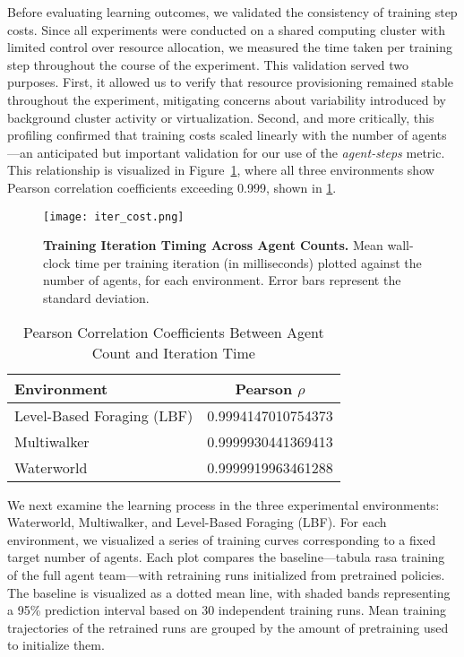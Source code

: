 Before evaluating learning outcomes, we validated the consistency of training step costs.
Since all experiments were conducted on a shared computing cluster with limited 
control over resource allocation, we measured the time taken per training
step throughout the course of the experiment. This validation served two purposes. First, 
it allowed us to verify that resource provisioning remained stable throughout the experiment, 
mitigating concerns about variability introduced by background cluster activity or virtualization.
Second, and more critically, this profiling confirmed that training costs scaled linearly 
with the number of agents—an anticipated but important validation for our use of the 
\emph{agent-steps} metric. This relationship is visualized in Figure~\ref{fig:agent-steps}, 
where all three environments show Pearson correlation coefficients exceeding 0.999,
shown in \ref{tab:pearson-corr}.
\begin{figure}[!ht]
    \centering
    \texttt{[image: iter\_cost.png]}
    \caption{\textbf{Training Iteration Timing Across Agent Counts.} %
        Mean wall-clock time per training iteration (in milliseconds) plotted against the number 
        of agents, for each environment. Error bars represent the standard deviation.}
    \label{fig:agent-steps}
\end{figure}
%
\begin{table}[ht]
    \centering
    \begin{tabular}{lc}
        \toprule
        \textbf{Environment} & \textbf{Pearson $\rho$} \\
        \midrule
        Level-Based Foraging (LBF)  & 0.9994147010754373 \\
        Multiwalker                 & 0.9999930441369413 \\
        Waterworld                  & 0.9999919963461288 \\
        \bottomrule
    \end{tabular}
    \caption{Pearson Correlation Coefficients Between Agent Count and Iteration Time}
    \label{tab:pearson-corr}
\end{table}

We next examine the learning process in the three experimental environments: 
Waterworld, Multiwalker, and Level-Based Foraging (LBF). For each environment, 
we visualized a series of training curves corresponding to a fixed target number of agents.
Each plot compares the baseline—tabula rasa training of the full agent team—with 
retraining runs initialized from pretrained policies.
The baseline is visualized as a dotted mean line, with shaded bands 
representing a 95\% prediction interval based on 30 independent training runs.
Mean training trajectories of the retrained runs are grouped by the amount 
of pretraining used to initialize them.

